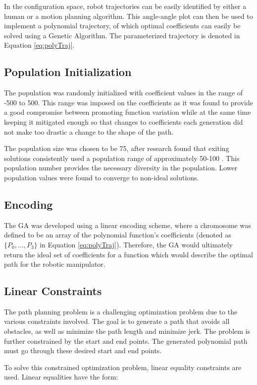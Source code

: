 In the configuration space, robot trajectories can be easily identified by either a human or a motion planning algorithm. This angle-angle plot can then be used to implement a polynomial trajectory, of which optimal coefficients can easily be solved using a Genetic Algorithm. The parameterized trajectory is denoted in Equation \ref{eq:polyTraj}.

\subsection{Population Initialization}

The population was randomly initialized with coefficient values in the range of -500 to 500. This range was imposed on the coefficients as it was found to provide a good compromise between promoting function variation while at the same time keeping it mitigated enough so that changes to coefficients each generation did not make too drastic a change to the shape of the path.

The population size was chosen to be 75, after research found that exiting solutions consistently used a population range of approximately 50-100 \cite{gulsen95}. This population number provides the necessary diversity in the population. Lower population values were found to converge to non-ideal solutions.

\subsection{Encoding}
The GA was developed using a linear encoding scheme, where a chromosome was defined to be an array of the polynomial function's coefficients (denoted as $\{P_0, \ldots, P_3\}$ in Equation \ref{eq:polyTraj}). Therefore, the GA would ultimately return the ideal set of coefficients for a function which would describe the optimal path for the robotic manipulator.

\subsection{Linear Constraints}
The path planning problem is a challenging optimization problem due to the various constraints involved. The goal is to generate a path that avoids all obstacles, as well as minimize the path length and minimize jerk. The problem is further constrained by the start and end points. The generated polynomial path must go through these desired start and end points.

To solve this constrained optimization problem, linear equality constraints are used. Linear equalities have the form:

